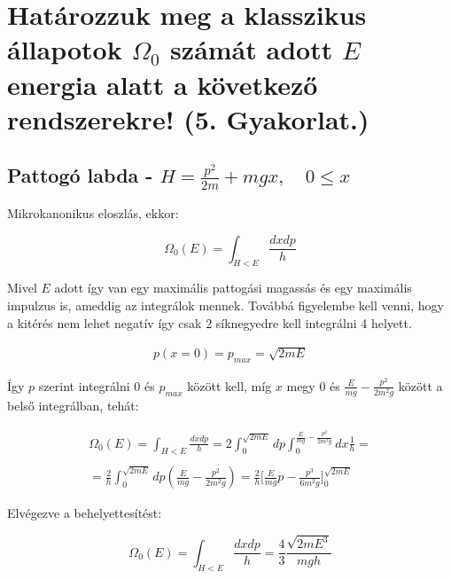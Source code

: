 \documentclass[a4paper,12pt]{article}
\begin{document}
\section{Határozzuk meg a klasszikus állapotok $\Omega_{0}$ számát adott $E$ energia alatt a következő rendszerekre! (5. Gyakorlat.)}

\subsection{Pattogó labda - $H = \frac{p^{2}}{2m} + mgx, \quad 0 \leq  x$}

\par Mikrokanonikus eloszlás, ekkor:

\begin{equation*}
\Omega_0(E) = \int_{H < E}\frac{dxdp}{h} 
\end{equation*}

\par Mivel $E$ adott így van egy maximális pattogási magassás és egy maximális impulzus is, ameddig az integrálok mennek. Továbbá figyelembe kell venni, hogy a kitérés nem lehet negatív így csak 2 síknegyedre kell integrálni 4 helyett.

\begin{gather*}
p(x = 0) = p_{max} = \sqrt{2mE} 
\end{gather*}

\par Így $p$ szerint integrálni $0$ és $p_{max}$ között kell, míg $x$ megy 0 és $\frac{E}{mg} - \frac{p^{2}}{2m^{2}g}$ között a belső integrálban, tehát:

\begin{equation*}
\begin{gathered}
\Omega_0(E) = \int_{H < E}\frac{dxdp}{h} = 2\int_{0}^{\sqrt{2mE}}dp\int_{0}^{\frac{E}{mg} - \frac{p^{2}}{2m^{2}g}}dx \frac{1}{h} = \\ \\
= \frac{2}{h}\int_{0}^{\sqrt{2mE}}dp(\frac{E}{mg} - \frac{p^{2}}{2m^{2}g}) = \frac{2}{h}\Big[\frac{E}{mg}p - \frac{p^{3}}{6m^{2}g}\Big]_{0}^{\sqrt{2mE}}
\end{gathered}
\end{equation*}

\par Elvégezve a behelyettesítést:

\begin{equation}
\Omega_0(E) = \int_{H < E}\frac{dxdp}{h} = \frac{4}{3}\frac{\sqrt{2mE^{3}}}{mgh}
\end{equation}
\end{document}
